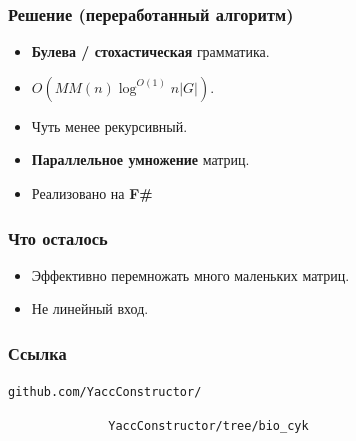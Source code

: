 \documentclass[28pt,pdf,hyperref={unicode}]{beamer}
\renewcommand{\emph}[1]{\textbf{\color{memph}#1}}
\begin{document}
\begin{frame}
\frametitle{Решение (переработанный алгоритм)}

\begin{itemize}
\setlength\itemsep{0.5em}
\item {\color{mgreen} \textbf{Булева / стохастическая} грамматика.}
\item {\color{mgreen}$O\left(MM(n) \log^{O(1)}n |G|\right)$.}
\item {\color{mgreen}Чуть менее рекурсивный.}
\item {\color{mgreen} \textbf{Параллельное умножение} матриц.}
\end{itemize}
\vskip20pt
\begin{itemize}
\item Реализовано на \emph{F\#}
\end{itemize}

\end{frame}



\begin{frame}
\frametitle{Что осталось}

\begin{itemize}
\setlength\itemsep{0.5em}
\item Эффективно перемножать много маленьких матриц.
\item Не линейный вход.
\end{itemize}

\end{frame}



\begin{frame}
\frametitle{Ссылка}

\texttt{github.com/YaccConstructor/}

\texttt{\ \ \ \ \ \ \ \ \ \ \ \ \ \ YaccConstructor/tree/bio\_cyk}

\end{frame}
\end{document}
